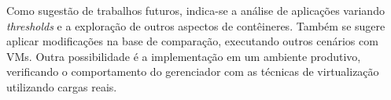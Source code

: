 \documentclass[twoside,english,brazilian]{UNISINOSartigo}
\begin{document}
Como sugestão de trabalhos futuros, indica-se a análise de aplicações variando \textit{thresholds} e a exploração de outros aspectos de contêineres. Também se sugere aplicar modificações na base de comparação, executando outros cenários com VMs. Outra possibilidade é a implementação em um ambiente produtivo, verificando o comportamento do gerenciador com as técnicas de virtualização utilizando cargas reais. 

\end{document}
